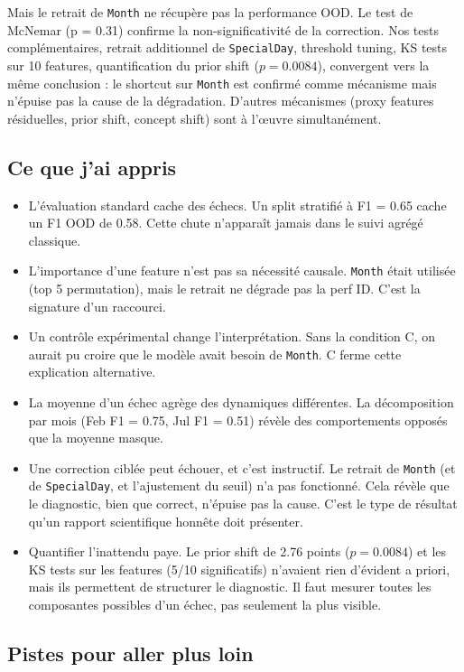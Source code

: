 \documentclass[11pt,a4paper]{article}
\newcommand{\code}[1]{\texttt{\small#1}}
\begin{document}
Mais le retrait de \code{Month} ne récupère pas la performance OOD. Le test de McNemar (p = 0.31) confirme la non-significativité de la correction. Nos tests complémentaires, retrait additionnel de \code{SpecialDay}, threshold tuning, KS tests sur 10 features, quantification du prior shift ($p = 0.0084$), convergent vers la même conclusion : le shortcut sur \code{Month} est confirmé comme mécanisme mais n'épuise pas la cause de la dégradation. D'autres mécanismes (proxy features résiduelles, prior shift, concept shift) sont à l'œuvre simultanément.

\subsection*{Ce que j'ai appris}

\begin{itemize}
\item L'évaluation standard cache des échecs. Un split stratifié à F1 = 0.65 cache un F1 OOD de 0.58. Cette chute n'apparaît jamais dans le suivi agrégé classique.
\item L'importance d'une feature n'est pas sa nécessité causale. \code{Month} était utilisée (top 5 permutation), mais le retrait ne dégrade pas la perf ID. C'est la signature d'un raccourci.
\item Un contrôle expérimental change l'interprétation. Sans la condition C, on aurait pu croire que le modèle \og avait besoin \fg{} de \code{Month}. C ferme cette explication alternative.
\item La moyenne d'un échec agrège des dynamiques différentes. La décomposition par mois (Feb F1 = 0.75, Jul F1 = 0.51) révèle des comportements opposés que la moyenne masque.
\item Une correction ciblée peut échouer, et c'est instructif. Le retrait de \code{Month} (et de \code{SpecialDay}, et l'ajustement du seuil) n'a pas fonctionné. Cela révèle que le diagnostic, bien que correct, n'épuise pas la cause. C'est le type de résultat qu'un rapport scientifique honnête doit présenter.
\item Quantifier l'inattendu paye. Le prior shift de 2.76 points ($p = 0.0084$) et les KS tests sur les features (5/10 significatifs) n'avaient rien d'évident a priori, mais ils permettent de structurer le diagnostic. Il faut mesurer toutes les composantes possibles d'un échec, pas seulement la plus visible.
\end{itemize}

\subsection*{Pistes pour aller plus loin}
\end{document}
